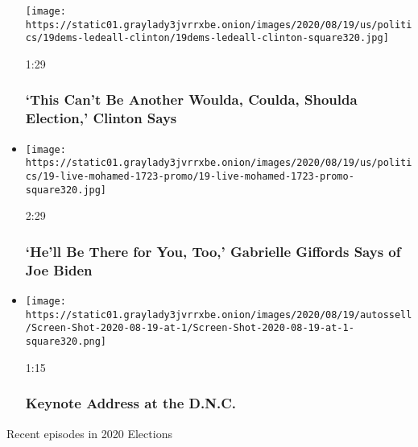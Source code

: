 \begin{itemize}
  \texttt{[image: https://static01.graylady3jvrrxbe.onion/images/2020/08/19/us/politics/19dems-ledeall-clinton/19dems-ledeall-clinton-square320.jpg]}

  1:29

  \hypertarget{this-cant-be-another-woulda-coulda-shoulda-election-clinton-says}{%
  \subsubsection{`This Can't Be Another Woulda, Coulda, Shoulda
  Election,' Clinton
  Says}\label{this-cant-be-another-woulda-coulda-shoulda-election-clinton-says}}
\item
  \href{https://www.nytimes3xbfgragh.onion/video/us/elections/100000007297620/gabrielle-giffords-speaks-dnc.html?action=click\&module=video-series-bar\&region=header\&pgtype=Article\&playlistId=video/2020-Elections}{}

  \texttt{[image: https://static01.graylady3jvrrxbe.onion/images/2020/08/19/us/politics/19-live-mohamed-1723-promo/19-live-mohamed-1723-promo-square320.jpg]}

  2:29

  \hypertarget{hell-be-there-for-you-too-gabrielle-giffords-says-of-joe-biden}{%
  \subsubsection{`He'll Be There for You, Too,' Gabrielle Giffords Says
  of Joe
  Biden}\label{hell-be-there-for-you-too-gabrielle-giffords-says-of-joe-biden}}
\item
  \href{https://www.nytimes3xbfgragh.onion/video/us/politics/100000007296108/keynote-address-dnc.html?action=click\&module=video-series-bar\&region=header\&pgtype=Article\&playlistId=video/2020-Elections}{}

  \texttt{[image: https://static01.graylady3jvrrxbe.onion/images/2020/08/19/autossell/Screen-Shot-2020-08-19-at-1/Screen-Shot-2020-08-19-at-1-square320.png]}

  1:15

  \hypertarget{keynote-address-at-the-dnc}{%
  \subsubsection{Keynote Address at the
  D.N.C.}\label{keynote-address-at-the-dnc}}
\end{itemize}

Recent episodes in 2020 Elections

